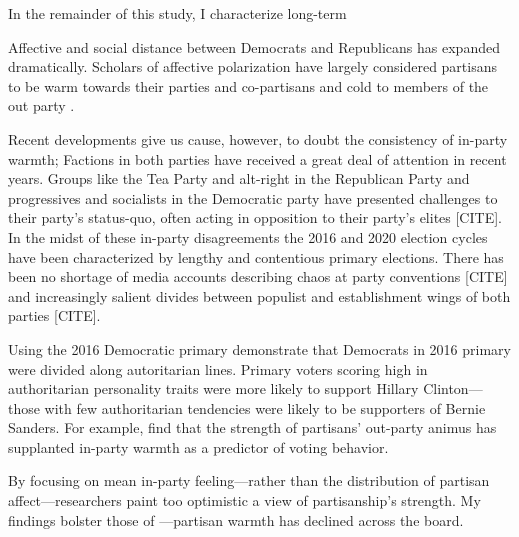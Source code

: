 \documentclass[12pt]{paper}
\begin{document}
In the remainder of this study, I characterize long-term 


Affective and social distance between Democrats and Republicans has expanded dramatically. Scholars of affective polarization have largely considered partisans to be warm towards their parties and co-partisans and cold to members of the out party \citep{iyengar2012affect, iyengar2018strengthening}.


Recent developments give us cause, however, to doubt the consistency of in-party warmth; Factions in both parties have received a great deal of attention in recent years. Groups like the Tea Party and alt-right in the Republican Party and progressives and socialists in the Democratic party have presented challenges to their party's status-quo, often acting in opposition to their party's elites [CITE]. In the midst of these in-party disagreements the 2016 and 2020 election cycles have been characterized by lengthy and contentious primary elections. There has been no shortage of media accounts describing chaos at party conventions [CITE] and increasingly salient divides between populist and establishment wings of both parties [CITE]. 

Using the 2016 Democratic primary \cite{wronski2018tale} demonstrate that Democrats in 2016 primary were divided along autoritarian lines. Primary voters scoring high in authoritarian personality traits were more likely to support Hillary Clinton---those with few authoritarian tendencies were likely to be supporters of Bernie Sanders. For example, \cite{iyengar2018strengthening} find that the strength of partisans' out-party animus has supplanted in-party warmth as a predictor of voting behavior. 



By focusing on mean in-party feeling---rather than the distribution of partisan affect---researchers paint too optimistic a view of partisanship's strength. My findings bolster those of  \cite{klar2018affective}---partisan warmth has declined across the board.

\end{document}
